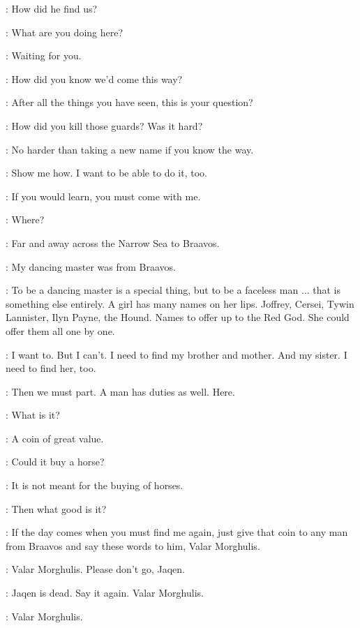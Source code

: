 \GENDRY: How did he find us? 


\ARYA: What are you doing here? 

\JAQEN: Waiting for you. 

\ARYA: How did you know we'd come this way? 

\JAQEN: After all the things you have seen, this is your question? 

\ARYA: How did you kill those guards? Was it hard? 

\JAQEN: No harder than taking a new name if you know the way. 

\ARYA: Show me how. I want to be able to do it, too. 

\JAQEN: If you would learn, you must come with me. 

\ARYA: Where? 

\JAQEN: Far and away across the Narrow Sea to Braavos. 

\ARYA: My dancing master was from Braavos. 

\JAQEN: To be a dancing master is a special thing, but to be a faceless man $\ldots$ that is something else entirely. A girl has many names on her lips.  Joffrey, Cersei, Tywin Lannister, Ilyn Payne, the Hound. Names to offer up to the Red God. She could offer them all one by one. 

\ARYA: I want to. But I can't. I need to find my brother and mother. And my sister. I need to find her, too. 

\JAQEN: Then we must part. A man has duties as well. Here. 

\ARYA: What is it? 

\JAQEN: A coin of great value. 

\ARYA:  Could it buy a horse? 

\JAQEN: It is not meant for the buying of horses. 

\ARYA: Then what good is it? 

\JAQEN: If the day comes when you must find me again, just give that coin to any man from Braavos and say these words to him, Valar Morghulis. 

\ARYA: Valar Morghulis.  Please don't go, Jaqen. 

\JAQEN: Jaqen is dead. Say it again. Valar Morghulis. 

\ARYA: Valar Morghulis. 

